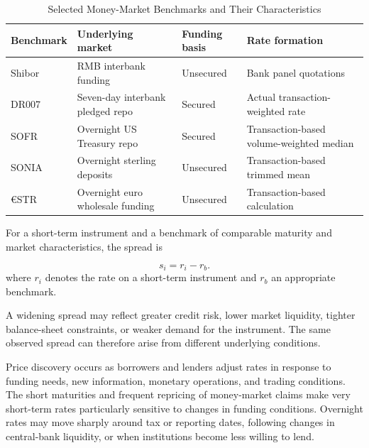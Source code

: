 \begin{table}[H]
\centering
\caption{Selected Money-Market Benchmarks and Their Characteristics}
\label{tab:ch7-benchmark-comparison}

\begin{tabularx}{\textwidth}{
@{}
>{\raggedright\arraybackslash}p{1.7cm}
>{\raggedright\arraybackslash}p{3.2cm}
>{\raggedright\arraybackslash}p{2.0cm}
Y
@{}
}

\toprule

\textbf{Benchmark}
&
\textbf{Underlying market}
&
\textbf{Funding basis}
&
\textbf{Rate formation}
\\

\midrule

Shibor
& RMB interbank funding
& Unsecured
& Bank panel quotations
\\

DR007
& Seven-day interbank pledged repo
& Secured
& Actual transaction-weighted rate
\\

SOFR
& Overnight US Treasury repo
& Secured
& Transaction-based volume-weighted median
\\

SONIA
& Overnight sterling deposits
& Unsecured
& Transaction-based trimmed mean
\\

€STR
& Overnight euro wholesale funding
& Unsecured
& Transaction-based calculation
\\

\bottomrule
\end{tabularx}
\end{table}

For a short-term instrument and a benchmark of comparable
maturity and market characteristics, the spread is

\begin{equation}
s_i=r_i-r_b.
\label{eq:ch7-money-market-spread}
\end{equation}
where $r_i$ denotes the rate on a short-term instrument and $r_b$ an appropriate benchmark.

A widening spread may reflect greater credit risk,
lower market liquidity, tighter balance-sheet constraints,
or weaker demand for the instrument. The same observed
spread can therefore arise from different underlying
conditions.

Price discovery occurs as borrowers and lenders adjust
rates in response to funding needs, new information,
monetary operations, and trading conditions. The short
maturities and frequent repricing of money-market claims
make very short-term rates particularly sensitive to
changes in funding conditions. Overnight rates may move
sharply around tax or reporting dates, following changes
in central-bank liquidity, or when institutions become
less willing to lend.

